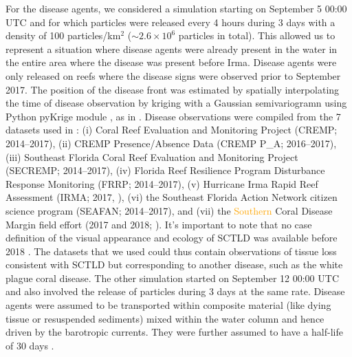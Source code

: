 \documentclass[fleqn,10pt]{wlscirep}
\newcommand{\modif}[1]{\textcolor{orange}{#1}}
\begin{document}
For the disease agents, we considered a simulation starting on September 5 00:00 UTC and for which particles were released every 4 hours during 3 days with a density of 100 particles/km$^2$ ($\sim2.6\times 10^{6}$ particles in total). This allowed us to represent a situation where disease agents were already present in the water in the entire area where the disease was present before Irma. Disease agents were only released on reefs where the disease signs were observed prior to September 2017. The position of the disease front was estimated by spatially interpolating the time of disease observation by kriging with a Gaussian semivariogramn using Python pyKrige module \citep{murphy2014pykrige}, as in \cite{DobbySCTLD}. Disease observations were compiled from the 7 datasets used in \cite{muller2020spatial}: (i) Coral Reef Evaluation and Monitoring Project (CREMP; 2014–2017), (ii) CREMP Presence/Absence Data (CREMP P\_A; 2016–2017), (iii) Southeast Florida Coral Reef Evaluation and Monitoring Project (SECREMP; 2014–2017), (iv) Florida Reef Resilience Program Disturbance Response Monitoring (FRRP; 2014–2017), (v) Hurricane Irma Rapid Reef Assessment (IRMA; 2017, \cite{viehman2018}), (vi) the Southeast Florida Action Network citizen science program (SEAFAN; 2014–2017), and (vii) the \modif{Southern} Coral Disease Margin field effort (2017 and 2018; \cite{neely2018surveying}). It's important to note that no case definition of the visual appearance and ecology of SCTLD was available before 2018 \citep{noaa2018}. The datasets that we used could thus contain observations of tissue loss consistent with SCTLD but corresponding to another disease, such as the white plague coral disease. The other simulation started on September 12 00:00 UTC and also involved the release of particles during 3 days at the same rate. Disease agents were assumed to be transported within composite material (like dying tissue or resuspended sediments) mixed within the water column and hence driven by the barotropic currents. They were further assumed to have a half-life of 30 days \citep{DobbySCTLD}.
\end{document}
